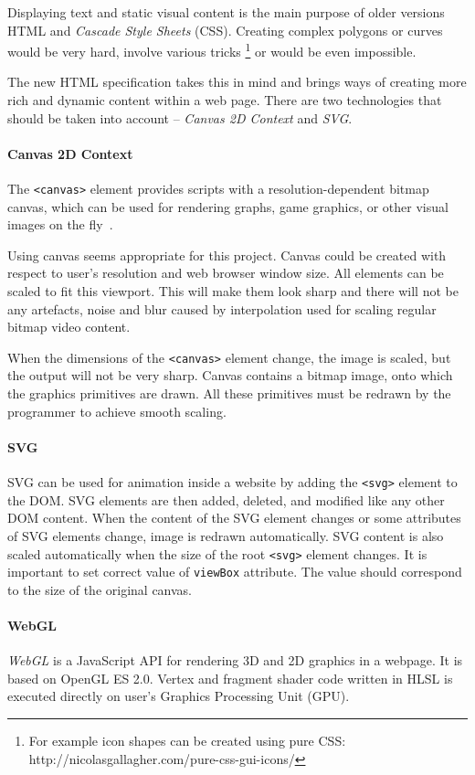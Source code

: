 Displaying text and static visual content is the main purpose of older versions HTML and \textit{Cascade Style Sheets} (CSS). Creating complex polygons or curves would be very hard, involve various tricks \footnote{For example icon shapes can be created using pure CSS: http://nicolasgallagher.com/pure-css-gui-icons/} or would be even impossible. 

The new HTML specification takes this in mind and brings ways of creating more rich and dynamic content within a web page. There are two technologies that should be taken into account -- \textit{Canvas 2D Context} and \textit{SVG}.

\paragraph{Canvas 2D Context}
The \verb|<canvas>| element provides scripts with a resolution-dependent bitmap canvas, which can be used for rendering graphs, game graphics, or other visual images on the fly~\cite{html5_canvas}. 

Using canvas seems appropriate for this project. Canvas could be created with respect to user's resolution and web browser window size. All elements can be scaled to fit this viewport. This will make them look sharp and there will not be any artefacts, noise and blur caused by interpolation used for scaling regular bitmap video content.

When the dimensions of the \verb|<canvas>| element change, the image is scaled, but the output will not be very sharp. Canvas contains a bitmap image, onto which the graphics primitives are drawn. All these primitives must be redrawn by the programmer to achieve smooth scaling.

\paragraph{SVG}
SVG can be used for animation inside a website by adding the \verb|<svg>| element to the DOM. SVG elements are then added, deleted, and modified like any other DOM content. When the content of the SVG element changes or some attributes of SVG elements change, image is redrawn automatically. SVG content is also scaled automatically when the size of the root \verb|<svg>| element changes. It is important to set correct value of \verb|viewBox| attribute. The value should correspond to the size of the original canvas.

\paragraph{WebGL}
\textit{WebGL} is a JavaScript API for rendering 3D and 2D graphics in a webpage. It is based on OpenGL ES 2.0. Vertex and fragment shader code written in HLSL is executed directly on user's Graphics Processing Unit (GPU).


